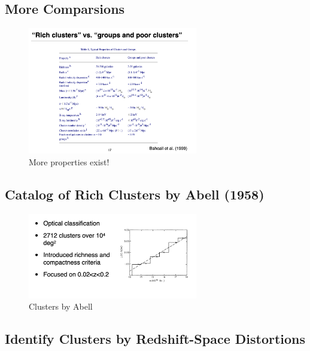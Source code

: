 \documentclass{article}
\begin{document}
\subsection{More Comparsions}

\begin{figure}
    \centering
    \includegraphics[width=0.66\textwidth]{figs/Screen Shot 2021-10-29 at 10.26.42 AM.png}
    \caption{More properties exist!}
    \label{fig:asdasdasdsaddaaas}
\end{figure}

\subsection{Catalog of Rich Clusters by Abell (1958)}

\begin{figure}
    \centering
    \includegraphics[width=0.66\textwidth]{figs/Screen Shot 2021-10-29 at 10.28.18 AM.png}
    \caption{Clusters by Abell}
    \label{fig:Abell_clusters}
\end{figure}

\subsection{Identify Clusters by Redshift-Space Distortions}
\end{document}

